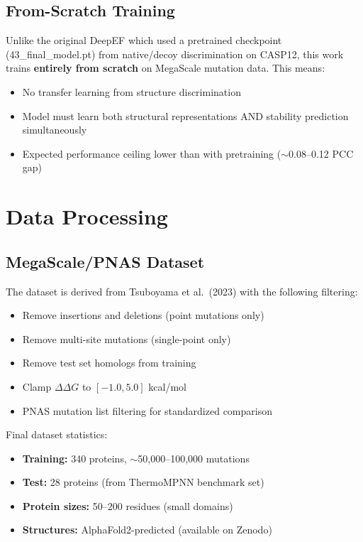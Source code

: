 \subsection{From-Scratch Training}

Unlike the original DeepEF which used a pretrained checkpoint (43\_final\_model.pt) from native/decoy discrimination on CASP12, this work trains \textbf{entirely from scratch} on MegaScale mutation data. This means:
\begin{itemize}
    \item No transfer learning from structure discrimination
    \item Model must learn both structural representations AND stability prediction simultaneously
    \item Expected performance ceiling lower than with pretraining ($\sim$0.08--0.12 PCC gap)
\end{itemize}

\section{Data Processing}

\subsection{MegaScale/PNAS Dataset}

The dataset is derived from Tsuboyama et al.\ (2023) with the following filtering:
\begin{itemize}
    \item Remove insertions and deletions (point mutations only)
    \item Remove multi-site mutations (single-point only)
    \item Remove test set homologs from training
    \item Clamp $\Delta\Delta G$ to $[-1.0, 5.0]$ kcal/mol
    \item PNAS mutation list filtering for standardized comparison
\end{itemize}

Final dataset statistics:
\begin{itemize}
    \item \textbf{Training:} 340 proteins, $\sim$50,000--100,000 mutations
    \item \textbf{Test:} 28 proteins (from ThermoMPNN benchmark set)
    \item \textbf{Protein sizes:} 50--200 residues (small domains)
    \item \textbf{Structures:} AlphaFold2-predicted (available on Zenodo)
\end{itemize}

